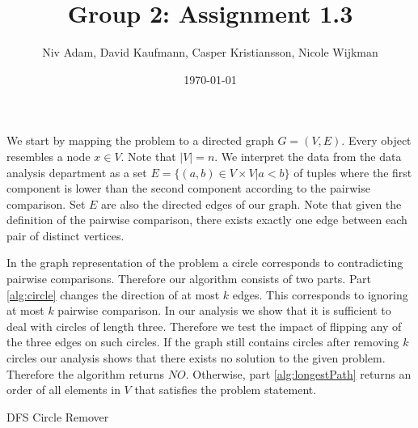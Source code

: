 \documentclass{article}
\title{Group 2: Assignment 1.3}
\author{Niv Adam, David Kaufmann, Casper Kristiansson, Nicole Wijkman}
\date{\today}
\begin{document}
\maketitle
\noindent

We start by mapping the problem to a directed graph $G=(V,E)$. Every object resembles a node $x\in V$. Note that $|V|=n$.
We interpret the data from the data analysis department as a set $E=\{(a,b)\in V\times V | a<b\}$ of tuples where the first component is lower than the second component according to the pairwise comparison. Set $E$ are also the directed edges of our graph. Note that given the definition of the pairwise comparison, there exists exactly one edge between each pair of distinct vertices.

In the graph representation of the problem a circle corresponds to contradicting pairwise comparisons. Therefore our algorithm consists of two parts. Part \ref{alg:circle} changes the direction of at most $k$ edges. This corresponds to ignoring at most $k$ pairwise comparison. In our analysis we show that it is sufficient to deal with circles of length three. Therefore we test the impact of flipping any of the three edges on such circles. If the graph still contains circles after removing $k$ circles our analysis shows that there exists no solution to the given problem. Therefore the algorithm returns $NO$. Otherwise, part \ref{alg:longestPath} returns an order of all elements in $V$ that satisfies the problem statement.
\begin{algorithm}\label{alg:circle}
\caption{DFS Circle Remover}
\DontPrintSemicolon


\end{algorithm}
\end{document}
